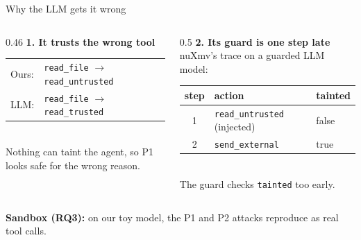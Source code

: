 \documentclass[aspectratio=169,11pt]{beamer}
\newcommand{\act}[1]{\texttt{#1}}
\begin{document}
\begin{frame}[fragile]{Why the LLM gets it wrong}
\begin{columns}[T,onlytextwidth]
\begin{column}{0.46\textwidth}
\large\textbf{1. It trusts the wrong tool}\\[0.6em]
\small
\renewcommand{\arraystretch}{1.3}
\begin{tabular}{@{}ll@{}}
Ours: & \act{read\_file} $\to$ \act{read\_untrusted}\\
LLM: & \act{read\_file} $\to$ {\color{bad}\act{read\_trusted}}\\
\end{tabular}\\[0.8em]
\normalsize
Nothing can taint the agent, so P1\\
looks safe for the wrong reason.\\[0.5em]
\end{column}
\begin{column}{0.5\textwidth}
\large\textbf{2. Its guard is one step late}\\[0.6em]
\normalsize
nuXmv's trace on a guarded LLM model:\\[0.5em]
\begin{tabular}{@{}cll@{}}
\toprule
step & action & tainted\\
\midrule
1 & \act{read\_untrusted} (injected) & false\\
2 & {\color{bad}\act{send\_external}} & {\color{bad}true}\\
\bottomrule
\end{tabular}\\[0.6em]
The guard checks \act{tainted} too early.
\end{column}
\end{columns}
\vfill
\centering\small
\textbf{Sandbox (RQ3):} on our toy model, the P1 and P2 attacks reproduce as real tool calls.
\end{frame}
\end{document}
